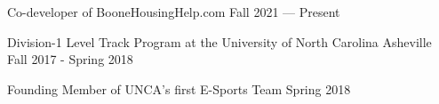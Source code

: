  Co-developer of BooneHousingHelp.com	\hfill Fall 2021 --- Present
 
Division-1 Level Track Program at the University of North Carolina Asheville	\hfill Fall 2017 - Spring 2018


Founding Member of UNCA's first E-Sports Team	\hfill Spring 2018




